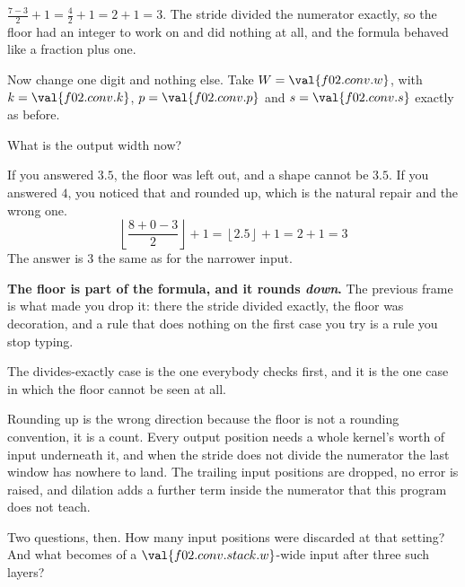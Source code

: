 \begin{fr}
$\frac{7 - 3}{2} + 1 = \frac{4}{2} + 1 = 2 + 1 = 3$. The stride divided the
numerator exactly, so the floor had an integer to work on and did nothing at
all, and the formula behaved like a fraction plus one.

Now change one digit and nothing else. Take $W = \val{f02.conv.w}$, with
$k = \val{f02.conv.k}$, $p = \val{f02.conv.p}$ and $s = \val{f02.conv.s}$
exactly as before.

What is the output width now?
\nextframe
\end{fr}

\begin{fr}
\begin{ansblock}
If you answered $\num{3.5}$, the floor was left out, and a shape cannot be
$\num{3.5}$. If you answered $4$, you noticed that and rounded up, which is the
natural repair and the wrong one.
\[ \left\lfloor \frac{8 + 0 - 3}{2} \right\rfloor + 1
   = \left\lfloor \num{2.5} \right\rfloor + 1 = 2 + 1 = 3 \]
The answer is $3$ \dash{} the same as for the narrower input.
\end{ansblock}

\begin{trapbox}
\textbf{The floor is part of the formula, and it rounds \emph{down}.} The
previous frame is what made you drop it: there the stride divided exactly, the
floor was decoration, and a rule that does nothing on the first case you try is
a rule you stop typing.

The divides-exactly case is the one everybody checks first, and it is the one
case in which the floor cannot be seen at all.

Rounding up is the wrong direction because the floor is not a rounding
convention, it is a count. Every output position needs a whole kernel's worth
of input underneath it, and when the stride does not divide the numerator the
last window has nowhere to land. The trailing input positions are dropped, no
error is raised, and dilation adds a further term inside the numerator that
this program does not teach.
\end{trapbox}
Two questions, then. How many input positions were discarded at that setting?
And what becomes of a $\val{f02.conv.stack.w}$-wide input after three such
layers?
\dotline
\nextframe
\end{fr}


